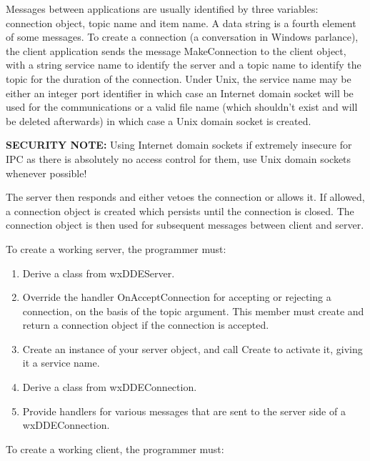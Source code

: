 Messages between applications are usually identified by three variables:
connection object, topic name and item name.  A data string is a fourth
element of some messages. To create a connection (a conversation in
Windows parlance), the client application sends the message
MakeConnection to the client object, with a string service name to
identify the server and a topic name to identify the topic for the
duration of the connection. Under Unix, the service name may be either an
integer port identifier in which case an Internet domain socket will be used
for the communications or a valid file name (which shouldn't exist and will be
deleted afterwards) in which case a Unix domain socket is created.

{\bf SECURITY NOTE:} Using Internet domain sockets if extremely insecure for
IPC as there is absolutely no access control for them, use Unix domain sockets
whenever possible!

The server then responds and either vetoes the connection or allows it.
If allowed, a connection object is created which persists until the
connection is closed.  The connection object is then used for subsequent
messages between client and server.

To create a working server, the programmer must:

\begin{enumerate}\itemsep=0pt
\item Derive a class from wxDDEServer.
\item Override the handler OnAcceptConnection for accepting or rejecting a connection,
on the basis of the topic argument. This member must create and return a connection
object if the connection is accepted.
\item Create an instance of your server object, and call Create to
activate it, giving it a service name.
\item Derive a class from wxDDEConnection.
\item Provide handlers for various messages that are sent to the server
side of a wxDDEConnection.
\end{enumerate}

To create a working client, the programmer must:

